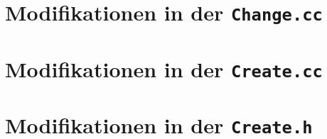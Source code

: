 \section{Modifikationen in der \texttt{Change.cc}}


\section{Modifikationen in der \texttt{Create.cc}}


\section{Modifikationen in der \texttt{Create.h}}
